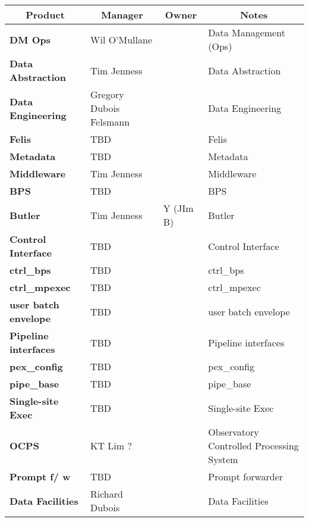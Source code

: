 

\scriptsize
\hline
\begin{longtable} {
|p{}   |p{}|p{} |p{}|}
\multicolumn{1}{c|}{\textbf{Product}} &
\multicolumn{1}{c|}{\textbf{Manager}} &
\multicolumn{1}{c|}{\textbf{Owner}} &
\multicolumn{1}{c}{\textbf{Notes}}|\\ \hline
{\textbf{DM Ops}} & Wil O'Mullane &  & Data Management (Ops) \\ \hline
{\textbf{Data Abstraction}} & Tim Jenness &  & Data Abstraction \\ \hline
{\textbf{Data Engineering}} & Gregory Dubois Felsmann &  & Data Engineering \\ \hline
{\textbf{Felis}} & TBD &  & Felis \\ \hline
{\textbf{Metadata}} & TBD &  & Metadata \\ \hline
{\textbf{Middleware}} & Tim Jenness &  & Middleware \\ \hline
{\textbf{BPS}} & TBD &  & BPS \\ \hline
{\textbf{Butler}} & Tim Jenness & Y (JIm B) & Butler \\ \hline
{\textbf{Control Interface}} & TBD &  & Control Interface \\ \hline
{\textbf{ctrl\_bps}} & TBD &  & ctrl\_bps \\ \hline
{\textbf{ctrl\_mpexec}} & TBD &  & ctrl\_mpexec \\ \hline
{\textbf{user batch envelope}} & TBD &  & user batch envelope \\ \hline
{\textbf{Pipeline interfaces}} & TBD &  & Pipeline interfaces \\ \hline
{\textbf{pex\_config}} & TBD &  & pex\_config \\ \hline
{\textbf{pipe\_base}} & TBD &  & pipe\_base \\ \hline
{\textbf{Single-site Exec}} & TBD &  & Single-site Exec \\ \hline
{\textbf{OCPS}} & KT Lim ? &  & Observatory Controlled Processing System \\ \hline
{\textbf{Prompt f/ w}} & TBD &  & Prompt forwarder \\ \hline
{\textbf{Data Facilities}} & Richard Dubois &  & Data Facilities \\ \hline

\end{longtable}
